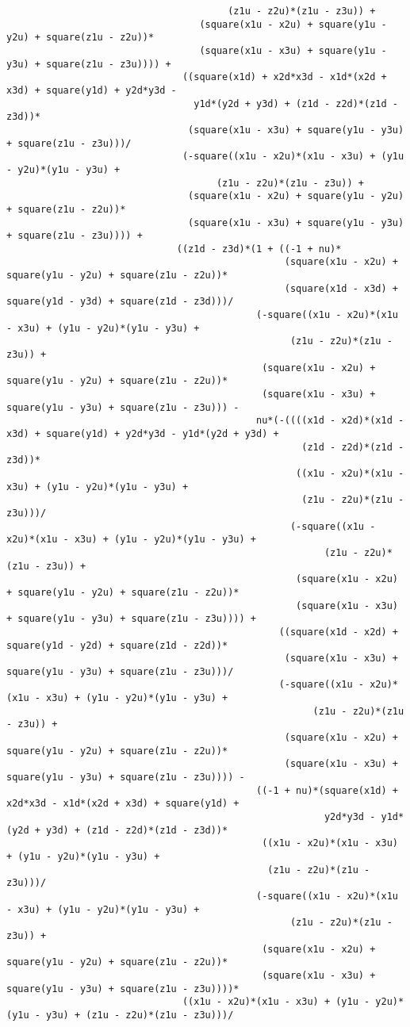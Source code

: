 \begin{lstlisting}
									   (z1u - z2u)*(z1u - z3u)) + 
								  (square(x1u - x2u) + square(y1u - y2u) + square(z1u - z2u))*
								  (square(x1u - x3u) + square(y1u - y3u) + square(z1u - z3u)))) + 
							   ((square(x1d) + x2d*x3d - x1d*(x2d + x3d) + square(y1d) + y2d*y3d - 
								 y1d*(y2d + y3d) + (z1d - z2d)*(z1d - z3d))*
								(square(x1u - x3u) + square(y1u - y3u) + square(z1u - z3u)))/
							   (-square((x1u - x2u)*(x1u - x3u) + (y1u - y2u)*(y1u - y3u) + 
									 (z1u - z2u)*(z1u - z3u)) + 
								(square(x1u - x2u) + square(y1u - y2u) + square(z1u - z2u))*
								(square(x1u - x3u) + square(y1u - y3u) + square(z1u - z3u)))) + 
							  ((z1d - z3d)*(1 + ((-1 + nu)*
												 (square(x1u - x2u) + square(y1u - y2u) + square(z1u - z2u))*
												 (square(x1d - x3d) + square(y1d - y3d) + square(z1d - z3d)))/
											(-square((x1u - x2u)*(x1u - x3u) + (y1u - y2u)*(y1u - y3u) + 
												  (z1u - z2u)*(z1u - z3u)) + 
											 (square(x1u - x2u) + square(y1u - y2u) + square(z1u - z2u))*
											 (square(x1u - x3u) + square(y1u - y3u) + square(z1u - z3u))) - 
											nu*(-((((x1d - x2d)*(x1d - x3d) + square(y1d) + y2d*y3d - y1d*(y2d + y3d) + 
													(z1d - z2d)*(z1d - z3d))*
												   ((x1u - x2u)*(x1u - x3u) + (y1u - y2u)*(y1u - y3u) + 
													(z1u - z2u)*(z1u - z3u)))/
												  (-square((x1u - x2u)*(x1u - x3u) + (y1u - y2u)*(y1u - y3u) + 
														(z1u - z2u)*(z1u - z3u)) + 
												   (square(x1u - x2u) + square(y1u - y2u) + square(z1u - z2u))*
												   (square(x1u - x3u) + square(y1u - y3u) + square(z1u - z3u)))) + 
												((square(x1d - x2d) + square(y1d - y2d) + square(z1d - z2d))*
												 (square(x1u - x3u) + square(y1u - y3u) + square(z1u - z3u)))/
												(-square((x1u - x2u)*(x1u - x3u) + (y1u - y2u)*(y1u - y3u) + 
													  (z1u - z2u)*(z1u - z3u)) + 
												 (square(x1u - x2u) + square(y1u - y2u) + square(z1u - z2u))*
												 (square(x1u - x3u) + square(y1u - y3u) + square(z1u - z3u)))) - 
											((-1 + nu)*(square(x1d) + x2d*x3d - x1d*(x2d + x3d) + square(y1d) + 
														y2d*y3d - y1d*(y2d + y3d) + (z1d - z2d)*(z1d - z3d))*
											 ((x1u - x2u)*(x1u - x3u) + (y1u - y2u)*(y1u - y3u) + 
											  (z1u - z2u)*(z1u - z3u)))/
											(-square((x1u - x2u)*(x1u - x3u) + (y1u - y2u)*(y1u - y3u) + 
												  (z1u - z2u)*(z1u - z3u)) + 
											 (square(x1u - x2u) + square(y1u - y2u) + square(z1u - z2u))*
											 (square(x1u - x3u) + square(y1u - y3u) + square(z1u - z3u))))*
							   ((x1u - x2u)*(x1u - x3u) + (y1u - y2u)*(y1u - y3u) + (z1u - z2u)*(z1u - z3u)))/

\end{lstlisting}
